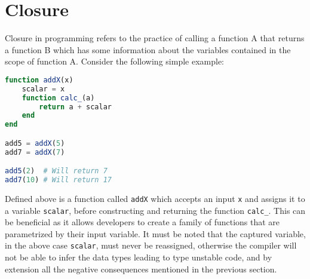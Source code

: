 \section{Closure}
Closure in programming refers to the practice of calling a function A that returns a function B which has some
information about the variables contained in the scope of function A. Consider the following simple example:
\begin{lstlisting}[language=Julia]
function addX(x)
    scalar = x
    function calc_(a)
        return a + scalar
    end
end

add5 = addX(5)
add7 = addX(7)

add5(2)  # Will return 7
add7(10) # Will return 17
\end{lstlisting}
Defined above is a function called \lstinline[language=Julia]{addX} which accepts an input \lstinline[language=Julia]{x}
and assigns it to a variable \lstinline[language=Julia]{scalar}, before constructing and returning the function
\lstinline[language=Julia]{calc_}. This can be beneficial as it allows developers to create a family of functions that
are parametrized by their input variable. It must be noted that the captured variable, in the above case
\lstinline[language=Julia]{scalar}, must never be reassigned, otherwise the compiler will not be able to infer the data
types leading to type unstable code, and by extension all the negative consequences mentioned in the previous section.

